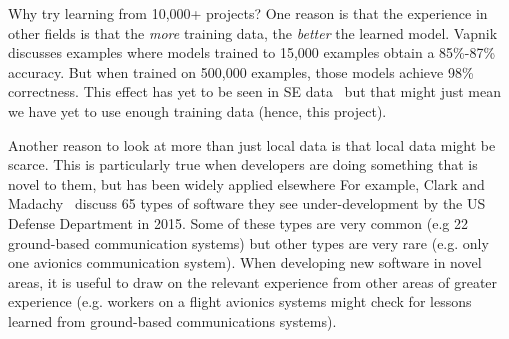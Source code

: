 Why try learning from 10,000+ projects?  One reason    is that
the experience in other fields is that the {\em more} training data,
the {\em better} the learned model. Vapnik~\cite{vapnik14} discusses examples
where models trained to  15,000 examples obtain a
85\%-87\% accuracy. But when trained on
  500,000   examples, those models  achieve 98\% correctness. This effect has yet to be seen in SE data~\cite{menzies2013guest} but that might just mean we have yet
  to use enough training data (hence, this project). 
  

Another reason to look at more than just local data
is that   local data might be scarce.
This is particularly true when developers are doing something that is novel to them, but has been widely applied elsewhere
For example,
Clark and Madachy~\cite{clark15} discuss 65 types of software they see        under-development by
the US Defense Department in 2015.   Some of these types are very common (e.g   22 ground-based communication systems)
but other types are very rare (e.g. only  one avionics communication system). When developing
 new software in  novel areas, it is useful to draw on the relevant  experience  from 
 other areas of greater experience (e.g. workers on a flight avionics systems might check for lessons
learned from ground-based communications systems).



